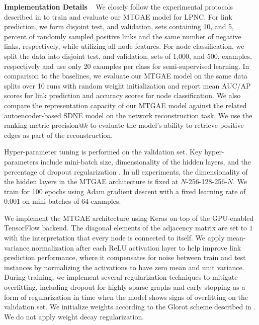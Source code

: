\documentclass{article}
\begin{document}
\noindent \textbf{Implementation Details} ~ We closely follow the experimental protocols described in \cite{Kipf:2016,VGAE:2016} to train and evaluate our MTGAE model for LPNC. For link prediction, we form disjoint test, and validation, sets containing 10, and 5, percent of randomly sampled positive links and the same number of negative links, respectively, while utilizing all node features. For node classification, we split the data into disjoint test, and validation, sets of 1,000, and 500, examples, respectively and use only 20 examples per class for semi-supervised learning. In comparison to the baselines, we evaluate our MTGAE model on the same data splits over 10 runs with random weight initialization and report mean AUC/AP scores for link prediction and accuracy scores for node classification. We also compare the representation capacity of our MTGAE model against the related autoencoder-based SDNE model on the network reconstruction task. We use the ranking metric precision@$k$ to evaluate the model's ability to retrieve positive edges as part of the reconstruction.

Hyper-parameter tuning is performed on the validation set. Key hyper-parameters include mini-batch size, dimensionality of the hidden layers, and the percentage of dropout regularization \cite{Srivastava:2014}. In all experiments, the dimensionality of the hidden layers in the MTGAE architecture is fixed at $N$-256-128-256-$N$. We train for 100 epochs using Adam \cite{Kingma:2015} gradient descent with a fixed learning rate of $0.001$ on mini-batches of 64 examples.

We implement the MTGAE architecture using Keras \cite{Keras} on top of the GPU-enabled TensorFlow \cite{TF} backend. The diagonal elements of the adjacency matrix are set to $1$ with the interpretation that every node is connected to itself. We apply mean-variance normalization after each ReLU activation layer to help improve link prediction performance, where it compensates for noise between train and test instances by normalizing the activations to have zero mean and unit variance. During training, we implement several regularization techniques to mitigate overfitting, including dropout for highly sparse graphs and early stopping as a form of regularization in time when the model shows signs of overfitting on the validation set. We initialize weights according to the Glorot scheme described in \cite{Xavier:2010}. We do not apply weight decay regularization.
\end{document}
